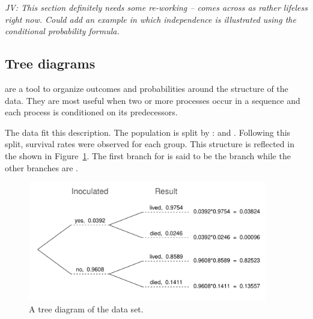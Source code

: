\begin{doublespace}
\textit{JV: This section definitely needs some re-working -- comes across as rather lifeless right now. Could add an example in which independence is illustrated using the conditional probability formula.}

\subsection{Tree diagrams}


 are a tool to organize outcomes and probabilities around the structure of the data. They are most useful when two or more processes occur in a sequence and each process is conditioned on its predecessors.

The  data fit this description. The population is split by :  and . Following this split, survival rates were observed for each group. This structure is reflected in the  shown in Figure~\ref{smallpoxTreeDiagram}. The first branch for  is said to be the  branch while the other branches are .

\begin{figure}[ht]
\centering
\includegraphics[width=0.93\textwidth]{ch_probability_oi_biostat/figures/smallpoxTreeDiagram/smallpoxTreeDiagram}
\caption{A tree diagram of the  data set.}
\label{smallpoxTreeDiagram}
\end{figure}


\end{doublespace}
